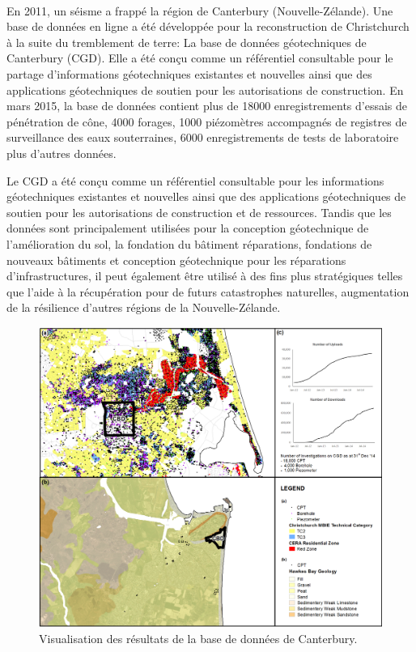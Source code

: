 
\paragraph{}
En 2011, un séisme a frappé la région de Canterbury (Nouvelle-Zélande). Une base de données en ligne a été développée pour
la reconstruction de Christchurch à la suite du tremblement de terre:
La base de données géotechniques de Canterbury (CGD). Elle
a été conçu comme un référentiel consultable pour le partage d'informations géotechniques existantes et nouvelles
ainsi que des applications géotechniques de soutien pour les autorisations de construction. En mars
2015, la base de données contient plus de 18000 enregistrements d'essais de pénétration de cône, 4000 forages, 1000
piézomètres accompagnés de registres de surveillance des eaux souterraines, 6000 enregistrements de tests de laboratoire
plus d'autres données. 

\par
Le CGD a été conçu comme un référentiel consultable pour les informations géotechniques existantes et nouvelles
ainsi que des applications géotechniques de soutien pour les autorisations de construction et de ressources. Tandis que
les données sont principalement utilisées pour la conception géotechnique de l'amélioration du sol, la fondation du bâtiment
réparations, fondations de nouveaux bâtiments et conception géotechnique pour les réparations d'infrastructures, il peut
également être utilisé à des fins plus stratégiques telles que l'aide à la récupération pour de futurs
catastrophes naturelles, augmentation de la résilience d'autres régions de la Nouvelle-Zélande.
\cite{scott2015benefits}


\begin{figure}[t]
\centering
\includegraphics[width=1\textwidth]{cgd.png}
\caption{Visualisation des résultats de la base de données de Canterbury.}
\end{figure}

